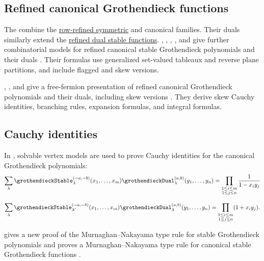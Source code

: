 \subsection[grothendieckRefinedCanonical]{Refined canonical Grothendieck functions}

The  combine the
\hyperref[grothendieckRefinedSymmetric]{row-refined symmetric} and canonical
families. Their duals similarly extend the
\hyperref[grothendieckRefinedDualStable]{refined dual stable functions}.
, , ,
, and  give further combinatorial models
for refined canonical stable Grothendieck polynomials and their duals
\cite{HwangJangKimSongSong2024x}.  Their formulas use generalized
set-valued tableaux and reverse plane partitions, and include flagged and skew
versions.

, , and 
give a free-fermion presentation of refined canonical Grothendieck polynomials
and their duals, including skew versions \cite{IwaoMotegiScrimshaw2024}.
They derive skew Cauchy identities, branching rules, expansion formulas, and
integral formulas.



\subsection[grothendieckCanonicalCauchy]{Cauchy identities}

In \cite{GunnaZinnJustin2020}, solvable vertex models are used to
prove Cauchy identities for the canonical Grothendieck polynomials:
\[
  \sum_{\lambda}  \grothendieckStable^{(-a,-b)}_\lambda(x_1,\dotsc,x_m) \grothendieckDual^{(a,b)}_\lambda(y_1,\dotsc,y_n)
  = \prod_{\substack{ 1 \leq i \leq m \\ 1 \leq j \leq n }} \frac{1}{1 - x_i y_j}
\]

\[
  \sum_{\lambda}  \grothendieckStable^{(-a,-b)}_{\lambda'}(x_1,\dotsc,x_m) \grothendieckDual^{(a,b)}_\lambda(y_1,\dotsc,y_n)
  = \prod_{\substack{ 1 \leq i \leq m \\ 1 \leq j \leq n }} (1 + x_i y_j ).
\]

 gives a new proof of the Murnaghan--Nakayama type
rule for stable Grothendieck polynomials and proves a Murnaghan--Nakayama
type rule for canonical stable Grothendieck functions \cite{Kundu2025x}.


